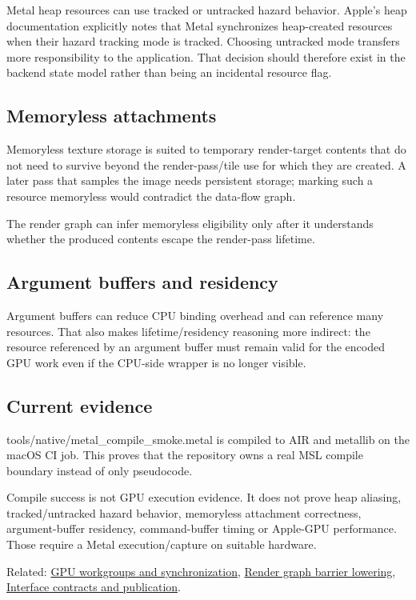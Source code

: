 Metal heap resources can use tracked or untracked hazard behavior. Apple's heap documentation explicitly notes that Metal synchronizes heap-created resources when their hazard tracking mode is tracked. Choosing untracked mode transfers more responsibility to the application. That decision should therefore exist in the backend state model rather than being an incidental resource flag.

\subsection{Memoryless attachments}\label{appendix-563b2cb23fc3-memoryless-attachments}

Memoryless texture storage is suited to temporary render-target contents that do not need to survive beyond the render-pass/tile use for which they are created. A later pass that samples the image needs persistent storage; marking such a resource memoryless would contradict the data-flow graph.

The render graph can infer memoryless eligibility only after it understands whether the produced contents escape the render-pass lifetime.

\subsection{Argument buffers and residency}\label{appendix-563b2cb23fc3-argument-buffers-and-residency}

Argument buffers can reduce CPU binding overhead and can reference many resources. That also makes lifetime/residency reasoning more indirect: the resource referenced by an argument buffer must remain valid for the encoded GPU work even if the CPU-side wrapper is no longer visible.

\subsection{Current evidence}\label{appendix-563b2cb23fc3-current-evidence}

tools/native/metal\_compile\_smoke.metal is compiled to AIR and metallib on the macOS CI job. This proves that the repository owns a real MSL compile boundary instead of only pseudocode.

Compile success is not GPU execution evidence. It does not prove heap aliasing, tracked/untracked hazard behavior, memoryless attachment correctness, argument-buffer residency, command-buffer timing or Apple-GPU performance. Those require a Metal execution/capture on suitable hardware.

Related: \hyperref[appendix-f662b5b1773b]{GPU workgroups and synchronization}, \hyperref[appendix-0fc95374cb7e]{Render graph barrier lowering}, \hyperref[appendix-fdae7ff0a23f]{Interface contracts and publication}.
